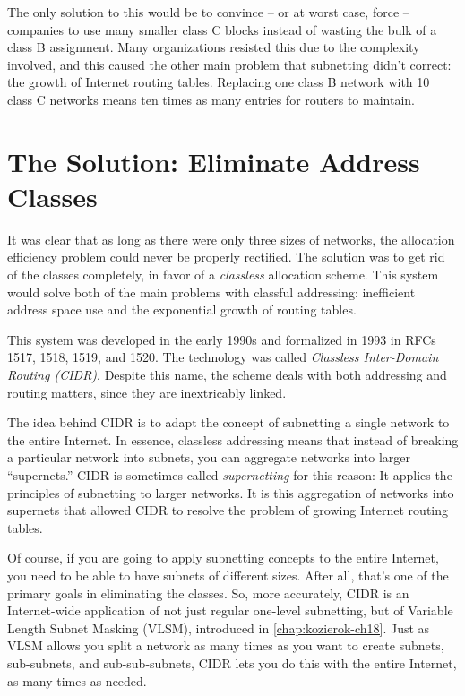 The only solution to this would be to convince -- or at worst case,
force -- companies to use many smaller class C blocks instead of wasting
the bulk of a class B assignment. Many organizations resisted this due
to the complexity involved, and this caused the other main problem that
subnetting didn't correct: the growth of Internet routing tables.
Replacing one class B network with 10 class C networks means ten times
as many entries for routers to maintain.

\section{The Solution: Eliminate Address Classes}

It was clear that as long as there were only three sizes of networks,
the allocation efficiency problem could never be properly rectified. The
solution was to get rid of the classes completely, in favor of a
{\emph{classless}}
allocation scheme. This system would solve both of the main problems
with classful addressing: inefficient address space use and the
exponential growth of routing tables.

This system was developed in the early 1990s and formalized in 1993 in
RFCs 1517, 1518, 1519, and 1520. The technology was called
{\emph{Classless Inter-Domain Routing (CIDR)}}. Despite this name, the
scheme deals with both addressing and routing matters, since they are
inextricably linked.

The idea behind CIDR is to adapt the concept of subnetting a single
network to the entire Internet. In essence, classless addressing means
that instead of breaking a particular network into subnets, you can
aggregate networks into larger ``supernets.''
CIDR is sometimes called {\emph{supernetting}} for this reason: It applies the principles of
subnetting to larger networks. It is this aggregation of networks into
supernets that allowed CIDR to resolve the problem of growing Internet
routing tables.

Of course, if you are going to apply subnetting concepts to the entire
Internet, you need to be able to have subnets of different sizes. After
all, that's one of the primary goals in eliminating the classes. So,
more accurately, CIDR is an Internet-wide application of not just
regular one-level subnetting, but of Variable Length Subnet Masking
(VLSM), introduced in \cref{chap:kozierok-ch18}. Just as
VLSM allows you split a network as many times as you want to create
subnets, sub-subnets, and sub-sub-subnets, CIDR lets you do this with
the entire Internet, as many times as needed.


